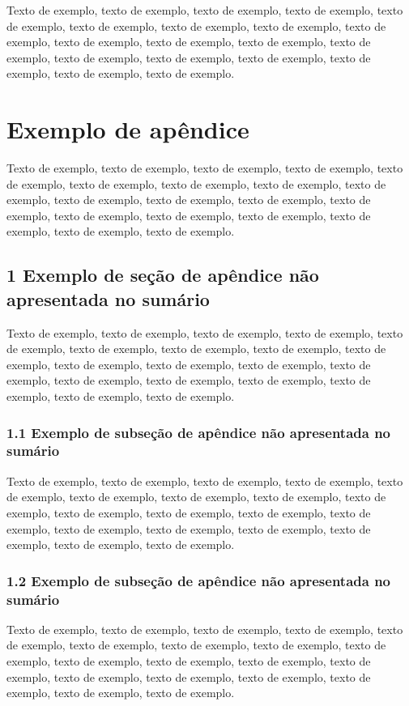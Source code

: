 \documentclass[
	12pt,				%
	oneside,			%
	a4paper,			%
	english,			%
	brazil				%
	]{abntex2ppgsi}
\begin{document}
\begin{apendicesenv}
Texto de exemplo, texto de exemplo, texto de exemplo, texto de exemplo, texto de exemplo, texto de exemplo, texto de exemplo, texto de exemplo, texto de exemplo, texto de exemplo, texto de exemplo, texto de exemplo, texto de exemplo, texto de exemplo, texto de exemplo, texto de exemplo, texto de exemplo, texto de exemplo, texto de exemplo.


\chapter{Exemplo de apêndice}

Texto de exemplo, texto de exemplo, texto de exemplo, texto de exemplo, texto de exemplo, texto de exemplo, texto de exemplo, texto de exemplo, texto de exemplo, texto de exemplo, texto de exemplo, texto de exemplo, texto de exemplo, texto de exemplo, texto de exemplo, texto de exemplo, texto de exemplo, texto de exemplo, texto de exemplo.

\section*{1 Exemplo de seção de apêndice não apresentada no sumário}

Texto de exemplo, texto de exemplo, texto de exemplo, texto de exemplo, texto de exemplo, texto de exemplo, texto de exemplo, texto de exemplo, texto de exemplo, texto de exemplo, texto de exemplo, texto de exemplo, texto de exemplo, texto de exemplo, texto de exemplo, texto de exemplo, texto de exemplo, texto de exemplo, texto de exemplo.

\subsection*{1.1 Exemplo de subseção de apêndice não apresentada no sumário}

Texto de exemplo, texto de exemplo, texto de exemplo, texto de exemplo, texto de exemplo, texto de exemplo, texto de exemplo, texto de exemplo, texto de exemplo, texto de exemplo, texto de exemplo, texto de exemplo, texto de exemplo, texto de exemplo, texto de exemplo, texto de exemplo, texto de exemplo, texto de exemplo, texto de exemplo.

\subsection*{1.2 Exemplo de subseção de apêndice não apresentada no sumário}

Texto de exemplo, texto de exemplo, texto de exemplo, texto de exemplo, texto de exemplo, texto de exemplo, texto de exemplo, texto de exemplo, texto de exemplo, texto de exemplo, texto de exemplo, texto de exemplo, texto de exemplo, texto de exemplo, texto de exemplo, texto de exemplo, texto de exemplo, texto de exemplo, texto de exemplo.


\end{apendicesenv}
\end{document}
